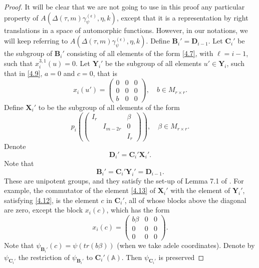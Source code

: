 \documentclass[12pts]{amsart}
\newcommand{\BA}{{\mathbb {A}}}
\begin{document}
\begin{proof}
	It will be clear that we are not going to use in this proof any
	particular property of $A(\Delta(\tau,m)\gamma_\psi^{(\epsilon)},\eta,k)$, except that it is a representation by right translations in a space of automorphic
	functions. However, in our notations, we
	will keep referring to $A(\Delta(\tau,m)\gamma_\psi^{(\epsilon)},\eta,k)$. Define
	$\mathbf{B}_i'=\mathbf{D}_{i-1}$. Let $\mathbf{C}_i'$ be the
	subgroup of $\mathbf{B}_i'$ consisting of all elements of the form
	\eqref{4.7}, with $\ell=i-1$, such that 
	$x_i^{3,1}(u)=0$. Let $\mathbf{Y}_i'$ be the subgroup of all elements
	$u'\in \mathbf{Y}_i$, such that in \eqref{4.9}, $a=0$ and $c=0$, that is
	\begin{equation}\label{4.12}
	x_i(u')=\begin{pmatrix}0&0&0\\0&0&0\\b&0&0\end{pmatrix},\quad 
	 b\in M_{r\times r}.
	\end{equation}
	Define $\mathbf{X}_i'$ to be the subgroup of all elements of the
	form
	\begin{equation}\label{4.13}
	p_i(\begin{pmatrix}I_r&
	&\beta\\&I_{m-2r}&0\\&&I_r\end{pmatrix}),\quad 
	\beta\in M_{r\times r}.
	\end{equation}
	Denote
	$$
	\mathbf{D}_i'=\mathbf{C}_i'\mathbf{X}_i'.
	$$
	Note that
	$$
	\mathbf{B}_i'=\mathbf{C}_i'\mathbf{Y}_i'=\mathbf{D}_{i-1}.
	$$
	These are unipotent groups, and they satisfy the set-up of Lemma 7.1
	of \cite{GRS11}. For example, the commutator of the element \eqref{4.13}
	of $\mathbf{X}_i'$ with the element of $\mathbf{Y}_i'$, satisfying
	\eqref{4.12}, is the element $c$ in $\mathbf{C}_i'$, all of whose
	blocks above the diagonal are zero, except the block $x_i(c)$, which
	has the form
	\begin{equation}\label{4.14}
	x_i(c)=\begin{pmatrix}b \beta
	&0&0\\0&0&0\\0&0&0\end{pmatrix}.
	\end{equation}
	Note that
	$\psi_{\mathbf{B}_i'}(c)=\psi(tr(b\beta))$ (when we take adele coordinates). Denote by
	$\psi_{\mathbf{C}_i'}$ the restriction of $\psi_{\mathbf{B}_i'}$ to
	$\mathbf{C}_i'(\BA)$. Then $\psi_{\mathbf{C}_i'}$ is preserved

\end{proof}
\end{document}
